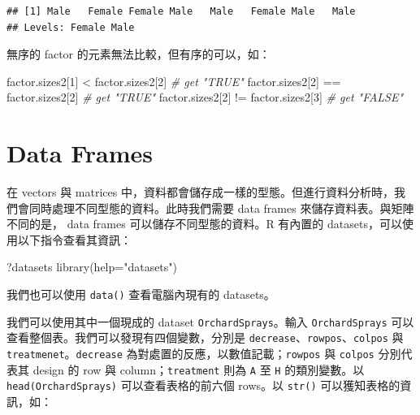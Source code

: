 \documentclass[
]{book}
\newenvironment{Shaded}{\begin{snugshade}}{\end{snugshade}}
\newcommand{\AttributeTok}[1]{\textcolor[rgb]{0.77,0.63,0.00}{#1}}
\newcommand{\CommentTok}[1]{\textcolor[rgb]{0.56,0.35,0.01}{\textit{#1}}}
\newcommand{\DecValTok}[1]{\textcolor[rgb]{0.00,0.00,0.81}{#1}}
\newcommand{\FunctionTok}[1]{\textcolor[rgb]{0.00,0.00,0.00}{#1}}
\newcommand{\NormalTok}[1]{#1}
\newcommand{\SpecialCharTok}[1]{\textcolor[rgb]{0.00,0.00,0.00}{#1}}
\newcommand{\StringTok}[1]{\textcolor[rgb]{0.31,0.60,0.02}{#1}}
\theoremstyle{definition}
\theoremstyle{remark}
\begin{document}
\begin{verbatim}
## [1] Male   Female Female Male   Male   Female Male   Male  
## Levels: Female Male
\end{verbatim}

無序的 factor 的元素無法比較，但有序的可以，如：

\begin{Shaded}
\begin{Highlighting}[]
\NormalTok{factor.sizes2[}\DecValTok{1}\NormalTok{] }\SpecialCharTok{\textless{}}\NormalTok{ factor.sizes2[}\DecValTok{2}\NormalTok{]  }\CommentTok{\# get "TRUE"}
\NormalTok{factor.sizes2[}\DecValTok{2}\NormalTok{] }\SpecialCharTok{==}\NormalTok{ factor.sizes2[}\DecValTok{2}\NormalTok{]  }\CommentTok{\# get "TRUE"}
\NormalTok{factor.sizes2[}\DecValTok{2}\NormalTok{] }\SpecialCharTok{!=}\NormalTok{ factor.sizes2[}\DecValTok{3}\NormalTok{]  }\CommentTok{\# get "FALSE"}
\end{Highlighting}
\end{Shaded}

\hypertarget{data-frames}{%
\section{Data Frames}\label{data-frames}}

在 vectors 與 matrices 中，資料都會儲存成一樣的型態。但進行資料分析時，我們會同時處理不同型態的資料。此時我們需要 data frames 來儲存資料表。與矩陣不同的是， data frames 可以儲存不同型態的資料。R 有內置的 datasets，可以使用以下指令查看其資訊：

\begin{Shaded}
\begin{Highlighting}[]
\NormalTok{?datasets}
\FunctionTok{library}\NormalTok{(}\AttributeTok{help=}\StringTok{"datasets"}\NormalTok{)}
\end{Highlighting}
\end{Shaded}

我們也可以使用 \texttt{data()} 查看電腦內現有的 datasets。

我們可以使用其中一個現成的 dataset \texttt{OrchardSprays}。輸入 \texttt{OrchardSprays} 可以查看整個表。我們可以發現有四個變數，分別是 \texttt{decrease}、\texttt{rowpos}、\texttt{colpos} 與 \texttt{treatmenet}。\texttt{decrease} 為對處置的反應，以數值記載；\texttt{rowpos} 與 \texttt{colpos} 分別代表其 design 的 row 與 column；\texttt{treatment} 則為 \texttt{A} 至 \texttt{H} 的類別變數。以 \texttt{head(OrchardSprays)} 可以查看表格的前六個 rows。以 \texttt{str()} 可以獲知表格的資訊，如：
\end{document}
